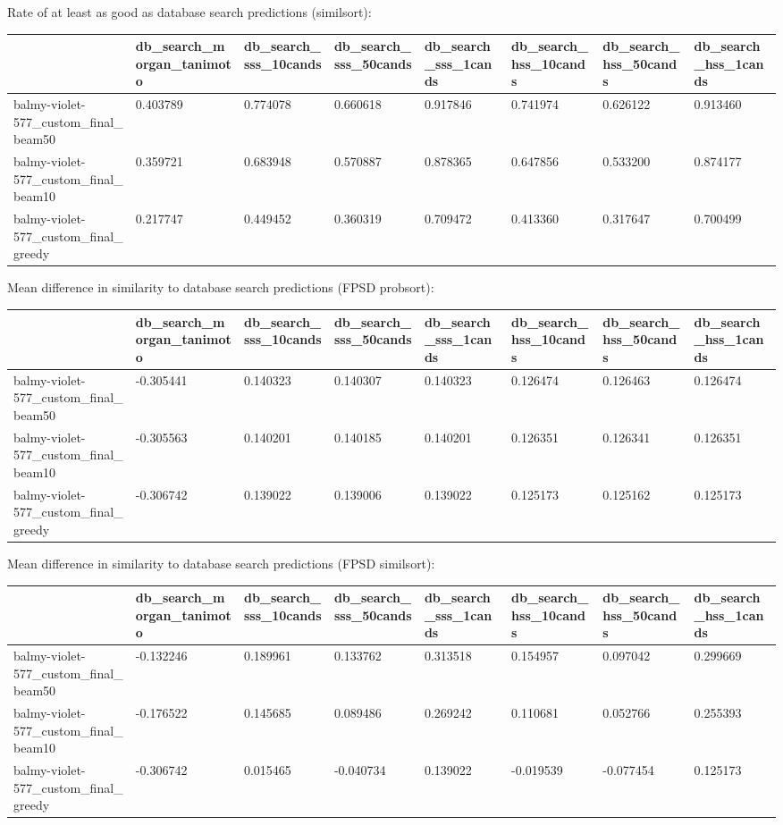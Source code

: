 Rate of at least as good as database search predictions (similsort):
\begin{tabular}{llllllll}
\toprule
 & db_search_morgan_tanimoto & db_search_sss_10cands & db_search_sss_50cands & db_search_sss_1cands & db_search_hss_10cands & db_search_hss_50cands & db_search_hss_1cands \\
\midrule
balmy-violet-577_custom_final_beam50 & 0.403789 & 0.774078 & 0.660618 & 0.917846 & 0.741974 & 0.626122 & 0.913460 \\
balmy-violet-577_custom_final_beam10 & 0.359721 & 0.683948 & 0.570887 & 0.878365 & 0.647856 & 0.533200 & 0.874177 \\
balmy-violet-577_custom_final_greedy & 0.217747 & 0.449452 & 0.360319 & 0.709472 & 0.413360 & 0.317647 & 0.700499 \\
\bottomrule
\end{tabular}



Mean difference in similarity to database search predictions (FPSD probsort):
\begin{tabular}{llllllll}
\toprule
 & db_search_morgan_tanimoto & db_search_sss_10cands & db_search_sss_50cands & db_search_sss_1cands & db_search_hss_10cands & db_search_hss_50cands & db_search_hss_1cands \\
\midrule
balmy-violet-577_custom_final_beam50 & -0.305441 & 0.140323 & 0.140307 & 0.140323 & 0.126474 & 0.126463 & 0.126474 \\
balmy-violet-577_custom_final_beam10 & -0.305563 & 0.140201 & 0.140185 & 0.140201 & 0.126351 & 0.126341 & 0.126351 \\
balmy-violet-577_custom_final_greedy & -0.306742 & 0.139022 & 0.139006 & 0.139022 & 0.125173 & 0.125162 & 0.125173 \\
\bottomrule
\end{tabular}



Mean difference in similarity to database search predictions (FPSD similsort):
\begin{tabular}{llllllll}
\toprule
 & db_search_morgan_tanimoto & db_search_sss_10cands & db_search_sss_50cands & db_search_sss_1cands & db_search_hss_10cands & db_search_hss_50cands & db_search_hss_1cands \\
\midrule
balmy-violet-577_custom_final_beam50 & -0.132246 & 0.189961 & 0.133762 & 0.313518 & 0.154957 & 0.097042 & 0.299669 \\
balmy-violet-577_custom_final_beam10 & -0.176522 & 0.145685 & 0.089486 & 0.269242 & 0.110681 & 0.052766 & 0.255393 \\
balmy-violet-577_custom_final_greedy & -0.306742 & 0.015465 & -0.040734 & 0.139022 & -0.019539 & -0.077454 & 0.125173 \\
\bottomrule
\end{tabular}



